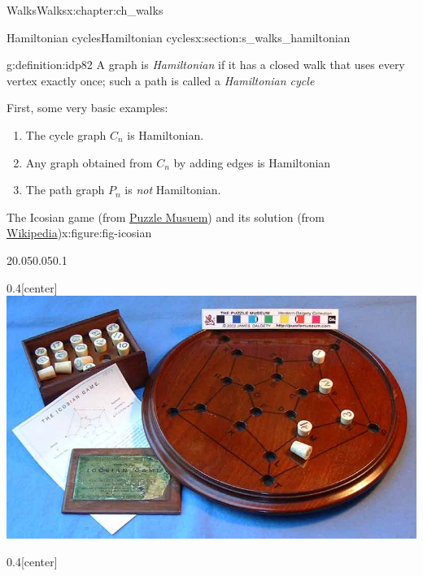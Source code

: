 \documentclass[oneside,10pt,]{book}
\numberwithin{equation}{section}
\begin{document}
\begin{chapterptx}{Walks}{}{Walks}{}{}{x:chapter:ch_walks}
\begin{sectionptx}{Hamiltonian cycles}{}{Hamiltonian cycles}{}{}{x:section:s_walks_hamiltonian}
\begin{definition}{}{g:definition:idp82}%
A graph is \emph{Hamiltonian} if it has a closed walk that uses every vertex exactly once; such a path is called a \emph{Hamiltonian cycle}%
\end{definition}
First, some very basic examples:%
%
\begin{enumerate}
\item{}The cycle graph \(C_n\) is Hamiltonian.%
\item{}Any graph obtained from \(C_n\) by adding edges is Hamiltonian%
\item{}The path graph \(P_n\) is \emph{not} Hamiltonian.%
\end{enumerate}
\begin{figureptx}{The Icosian game (from \href{https://www.puzzlemuseum.com/month/picm02/200207icosian.htm}{Puzzle Musuem}) and its solution (from \href{https://en.wikipedia.org/wiki/Icosian_game}{Wikipedia})}{x:figure:fig-icosian}{}%
\begin{sidebyside}{2}{0.05}{0.05}{0.1}%
\begin{sbspanel}{0.4}[center]%
\includegraphics[width=\linewidth]{images/icosiangame.jpg}
\end{sbspanel}%
\begin{sbspanel}{0.4}[center]%

\end{sbspanel}
\end{sidebyside}
\end{figureptx}
\end{sectionptx}
\end{chapterptx}
\end{document}
